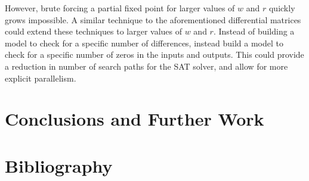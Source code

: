 \documentclass[10pt,twocolumn,twoside]{pnas-new}
\begin{document}
However, brute forcing a partial fixed point for larger values of $w$ and $r$
quickly grows impossible. A similar technique to the aforementioned
differential matrices could extend these techniques to larger values of $w$
and $r$. Instead of building a model to check for a specific number of
differences, instead build a model to check for a specific number of zeros in
the inputs and outputs. This could provide a reduction in number of search
paths for the SAT solver, and allow for more explicit parallelism.



\section{Conclusions and Further Work} \label{sec:conclusion}


\section{Bibliography} \label{sec:bibliography}


\end{document}
